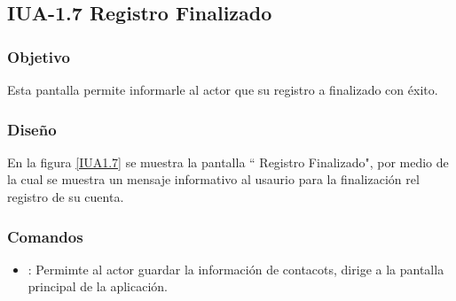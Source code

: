 \subsection{IUA-1.7 Registro Finalizado}

\subsubsection{Objetivo}

	
 Esta pantalla permite informarle al actor que su registro a finalizado con éxito.

\subsubsection{Diseño}


    En la figura \ref{IUA1.7} se muestra la pantalla `` Registro Finalizado", por medio de la cual se muestra un mensaje informativo al usaurio para la finalización rel registro de su cuenta.

    

   

\subsubsection{Comandos}
    \begin{itemize}
    	\item {}: Permimte al actor guardar la información de contacots, dirige a la pantalla principal de la aplicación.
        
    \end{itemize}